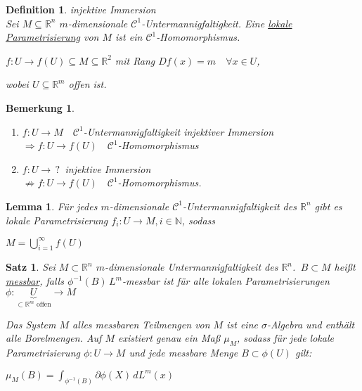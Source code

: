 \documentclass[11pt]{memoir}
\theoremstyle{changebreak}
\newtheorem{Definition}{Definition}[chapter]
\newtheorem{Bemerkung}{Bemerkung}[chapter]
\newtheorem{Lemma}{Lemma}[chapter]
\newtheorem{Satz}{Satz}[chapter]
\newcommand{\umgf}{$m$-dimensionale Untermannigfaltigkeit des $\mathbb R^n$}
\begin{document}
\begin{Definition}
\emph{injektive Immersion} \\
Sei $M \subseteq \mathbb R^n$ $m$-dimensionale $\mathscr C^1$-Untermannigfaltigkeit. Eine \underline{lokale Parametrisierung} von $M$ ist ein $\mathscr C^1$-Homomorphismus.
\par\bigskip
$f: U \rightarrow f(U) \subseteq M \subseteq \mathbb R^2$ mit Rang $Df(x) = m \quad \forall x \in U$,
\par
wobei $U \subseteq \mathbb R^m$ offen ist.
\end{Definition}

\begin{Bemerkung}
\begin{enumerate}
	\item $f: U \rightarrow M \quad \mathscr C^1$-Untermannigfaltigkeit injektiver Immersion \\
	$\Rightarrow f:U \rightarrow f(U) \quad \mathscr C^1$-Homomorphismus

	\item $f: U \rightarrow \,?\,$ injektive Immersion \\
	$\nRightarrow f: U \rightarrow f(U) \quad \mathscr C^1$-Homomorphismus.
\end{enumerate}
\end{Bemerkung}

\begin{Lemma}
Für jedes $m$-dimensionale $\mathscr C^1$-Untermannigfaltigkeit des $\mathbb R^n$ gibt es lokale Parametrisierung $f_i: U \rightarrow M, i \in \mathbb N$, sodass
\begin{center}
	$M = \bigcup\limits_{i=1}^\infty f(U)$
\end{center}
\end{Lemma}


\begin{Satz}
Sei $M \subset \mathbb R^n$ \umgf. \,$ B \subset M$ heißt \underline{messbar}, falls $\phi^{-1}(B) \, L^m$-messbar ist für alle lokalen Parametrisierungen \\
 $\phi: \underbrace{U}_{\subset \mathbb R^m \text{ offen}} \rightarrow M$
 \par\bigskip
 Das System $M$ alles messbaren Teilmengen von $M$ ist eine $\sigma$-Algebra und enthält alle Borelmengen. Auf $M$ existiert genau ein Maß $\mu_M$, sodass für jede lokale Parametrisierung $\phi: U \rightarrow M$ und jede messbare Menge $B \subset \phi(U)$ gilt:
 \begin{center}
 	$\mu_M(B) = \int_{\phi^{-1}(B)} \partial \phi(X) \, d L^m(x)$
 \end{center}
\end{Satz}
\end{document}
